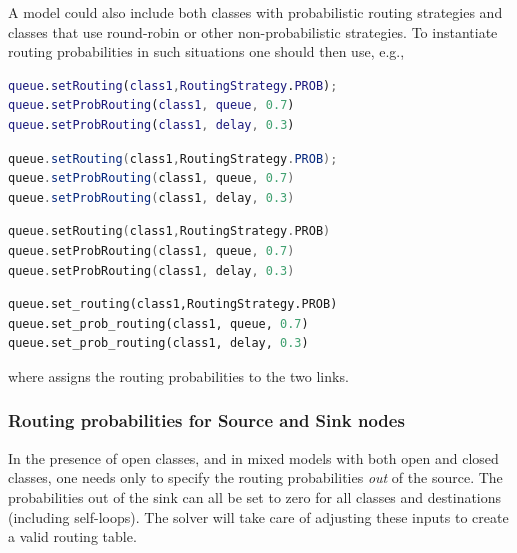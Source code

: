 A model could also include both classes with probabilistic routing strategies and classes that use round-robin or other non-probabilistic strategies. To instantiate routing probabilities in such situations one should then use, e.g.,
\begin{MATLAB}
\begin{lstlisting}[language = matlab]
queue.setRouting(class1,RoutingStrategy.PROB);
queue.setProbRouting(class1, queue, 0.7)
queue.setProbRouting(class1, delay, 0.3)
\end{lstlisting}
\end{MATLAB}
\begin{JAVA}
\begin{lstlisting}[language = java, basicstyle=\ttfamily\scriptsize]
queue.setRouting(class1,RoutingStrategy.PROB);
queue.setProbRouting(class1, queue, 0.7)
queue.setProbRouting(class1, delay, 0.3)
\end{lstlisting}
\end{JAVA}
\begin{KOTLIN}
\begin{lstlisting}[language = kotlin, basicstyle=\ttfamily\scriptsize]
queue.setRouting(class1,RoutingStrategy.PROB)
queue.setProbRouting(class1, queue, 0.7)
queue.setProbRouting(class1, delay, 0.3)
\end{lstlisting}
\end{KOTLIN}
\begin{PYTHON}
\begin{lstlisting}[language = python]
queue.set_routing(class1,RoutingStrategy.PROB)
queue.set_prob_routing(class1, queue, 0.7)
queue.set_prob_routing(class1, delay, 0.3)
\end{lstlisting}
\end{PYTHON}
where  assigns the routing probabilities to the two links.

\subsubsection{Routing probabilities for Source and Sink nodes}
In the presence of open classes, and in mixed models with both open and closed classes, one needs only to specify the routing probabilities {\em out} of the source. The probabilities out of the sink can all be set to zero for all classes and destinations (including self-loops). The solver will take care of adjusting these inputs to create a valid routing table.

